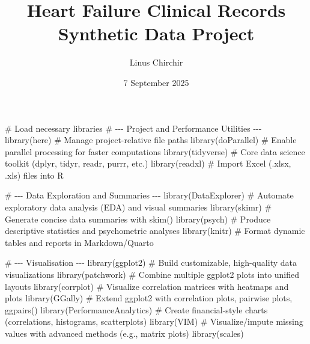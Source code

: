 \documentclass[
  letterpaper,
  DIV=11,
  numbers=noendperiod]{scrartcl}
\title{Heart Failure Clinical Records Synthetic Data Project}
\author{Linus Chirchir}
\date{7 September 2025}
\newenvironment{Shaded}{\begin{snugshade}}{\end{snugshade}}
\newcommand{\CommentTok}[1]{\textcolor[rgb]{0.37,0.37,0.37}{#1}}
\newcommand{\FunctionTok}[1]{\textcolor[rgb]{0.28,0.35,0.67}{#1}}
\newcommand{\NormalTok}[1]{\textcolor[rgb]{0.00,0.23,0.31}{#1}}
\renewcommand*\contentsname{Table of contents}
\newcommand\contentsname{Table of contents}
\begin{document}
\maketitle

\renewcommand*\contentsname{Table of contents}
{
\hypersetup{linkcolor=}
\setcounter{tocdepth}{4}
\tableofcontents
}
\listoftables

\begin{Shaded}
\begin{Highlighting}[]
\CommentTok{\# Load necessary libraries}
\CommentTok{\# {-}{-}{-} Project and Performance Utilities {-}{-}{-}}
\FunctionTok{library}\NormalTok{(here)                 }\CommentTok{\# Manage project{-}relative file paths}
\FunctionTok{library}\NormalTok{(doParallel)           }\CommentTok{\# Enable parallel processing for faster computations}
\FunctionTok{library}\NormalTok{(tidyverse)            }\CommentTok{\# Core data science toolkit (dplyr, tidyr, readr, purrr, etc.)}
\FunctionTok{library}\NormalTok{(readxl)               }\CommentTok{\# Import Excel (.xlsx, .xls) files into R}

\CommentTok{\# {-}{-}{-} Data Exploration and Summaries {-}{-}{-}}
\FunctionTok{library}\NormalTok{(DataExplorer)         }\CommentTok{\# Automate exploratory data analysis (EDA) and visual summaries}
\FunctionTok{library}\NormalTok{(skimr)                }\CommentTok{\# Generate concise data summaries with skim()}
\FunctionTok{library}\NormalTok{(psych)                }\CommentTok{\# Produce descriptive statistics and psychometric analyses}
\FunctionTok{library}\NormalTok{(knitr)                }\CommentTok{\# Format dynamic tables and reports in Markdown/Quarto}

\CommentTok{\# {-}{-}{-} Visualisation {-}{-}{-}}
\FunctionTok{library}\NormalTok{(ggplot2)              }\CommentTok{\# Build customizable, high{-}quality data visualizations}
\FunctionTok{library}\NormalTok{(patchwork)            }\CommentTok{\# Combine multiple ggplot2 plots into unified layouts}
\FunctionTok{library}\NormalTok{(corrplot)             }\CommentTok{\# Visualize correlation matrices with heatmaps and plots}
\FunctionTok{library}\NormalTok{(GGally)               }\CommentTok{\# Extend ggplot2 with correlation plots, pairwise plots, ggpairs()}
\FunctionTok{library}\NormalTok{(PerformanceAnalytics) }\CommentTok{\# Create financial{-}style charts (correlations, histograms, scatterplots)}
\FunctionTok{library}\NormalTok{(VIM)                  }\CommentTok{\# Visualize/impute missing values with advanced methods (e.g., matrix plots)}
\FunctionTok{library}\NormalTok{(scales)}


\end{Highlighting}
\end{Shaded}
\end{document}
